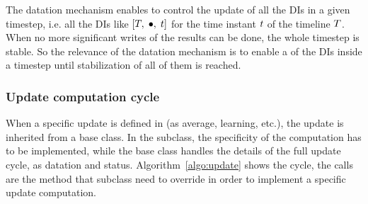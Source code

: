 The datation mechanism enables to control the update of all the DIs in a given timestep, i.e. all the DIs like $\left[ T,\;\bullet,\;t \right]$ for the time instant $t$ of the timeline $T$. When no more significant writes of the results can be done, the whole timestep is stable. So the relevance of the datation mechanism is to enable a  of the DIs inside a timestep until stabilization of all of them is reached.


\subsubsection{Update computation cycle}

When a specific update is defined in \CxSOM (as average, learning, etc.), the update is inherited from a base  class. In the subclass, the specificity of the computation has to be implemented, while the base class handles the details of the full update cycle, as datation and status. Algorithm~\ref{algo:update} shows the cycle, the  calls are the method that subclass need to override in order to implement a specific update computation.

